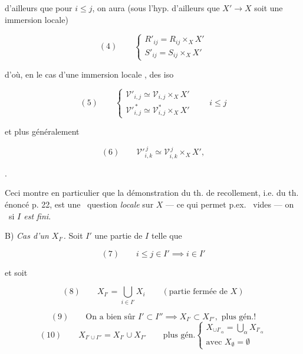 \documentclass[11pt,a4paper]{article}
\begin{document}

d'ailleurs que pour $i \leq j$, on aura (sous l'hyp. d'ailleurs que $X' \to X$
soit une immersion locale)

\[
  (4) \qquad
  \begin{cases}
    R'_{ij} = R_{ij} \times_X X' \\
    S'_{ij} = S_{ij} \times_X X'
  \end{cases}
\]

d'où, en le cas d'une immersion locale , des iso

\[
  (5) \qquad
  \begin{cases}
    \mathcal{V}'_{i,j} \simeq \mathcal{V}_{i,j} \times_X X' \\
    \mathcal{V}'^{\,*}_{i,j} \simeq \mathcal{V}^{*}_{i,j} \times_X X'
  \end{cases}
  \qquad i \leq j
\]

et plus généralement

\[
  (6) \qquad \mathcal{V}'^{\,j}_{i,k} \simeq \mathcal{V}^{\,j}_{i,k} \times_X X' ,
\]

\ill.

Ceci montre en particulier que la démonstration du th. de recollement, i.e. du
th. énoncé p. 22, est une \ill\ question \emph{locale} sur $X$ — ce qui permet
p.ex. \ill\ vides — on \ill\ si \emph{$I$ est fini}.

\marginal{\ill}




B) \emph{Cas d'un $X_{I'}$.}  Soit $I'$ une partie de $I$ telle que

\[
  (7) \qquad i \leq j \in I' \implies i \in I'
\]

et soit

\[
  (8) \qquad X_{I'} = \bigcup_{i \in I'} X_i \qquad (\text{partie fermée de } X)
\]

\[
  (9) \qquad \text{On a bien sûr } I' \subset I'' \implies X_{I'} \subset X_{I''} ,
  \text{ plus gén.!}
\]
\[
  (10) \qquad X_{I' \cup I''} = X_{I'} \cup X_{I''}
  \qquad \text{plus gén.}
  \begin{cases}
    X_{\cup I'_\alpha} = \bigcup\limits_\alpha X_{I'_\alpha} \\
    \text{avec } X_\emptyset = \emptyset
  \end{cases}
\]
\end{document}

